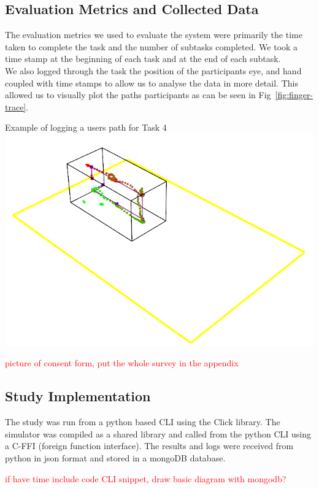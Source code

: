 \subsection{Evaluation Metrics and Collected Data}
The evaluation metrics we used to evaluate the system were primarily the time taken to complete the task and the number of subtasks completed. We took a time stamp at the beginning of each task and at the end of each subtask. \\

We also logged through the task the position of the participants eye, and hand coupled with time stamps to allow us to analyse the data in more detail. This allowed us to visually plot the paths participants as can be seen in Fig~\ref{fig:finger-trace}. \\


\begin{figureBox}[label={fig:finger-trace}, width=0.8\linewidth]{Example of logging a users path for Task 4}
    \includegraphics[width = 0.8\linewidth]{./implementation/figures/finger-trace-plot.png}
\end{figureBox}

\textcolor{red}{picture of consent form, put the whole survey in the appendix}

\subsection{Study Implementation}

The study was run from a python based CLI using the Click library. The simulator was compiled as a shared library and called from the python CLI using a C-FFI (foreign function interface). The results and logs were received from python in json format and stored in a mongoDB database.

\textcolor{red}{if have time include code CLI snippet, draw basic diagram with mongodb?}
